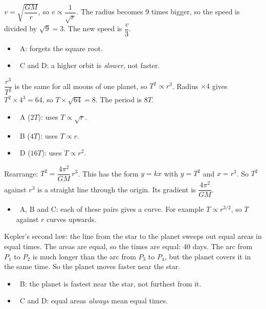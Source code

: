 \documentclass[12pt]{article}
\begin{document}
\begin{practiceanswers}
\begin{practiceans}
  $v = \sqrt{\dfrac{GM}{r}}$, so $v \propto \dfrac{1}{\sqrt{r}}$. The radius becomes 9 times
  bigger, so the speed is divided by $\sqrt{9} = 3$. The new speed is $\dfrac{v}{3}$.
  \begin{itemize}
    \item \xmark\ A: forgets the square root.
    \item \xmark\ C and D: a higher orbit is \emph{slower}, not faster.
  \end{itemize}
\end{practiceans}

\begin{practiceans}
  $\dfrac{r^3}{T^2}$ is the same for all moons of one planet, so $T^2 \propto r^3$. Radius
  $\times 4$ gives $T^2 \times 4^3 = 64$, so $T \times \sqrt{64} = 8$. The period is $8T$.
  \begin{itemize}
    \item \xmark\ A ($2T$): uses $T \propto \sqrt{r}$.
    \item \xmark\ B ($4T$): uses $T \propto r$.
    \item \xmark\ D ($16T$): uses $T \propto r^2$.
  \end{itemize}
\end{practiceans}

\begin{practiceans}
  Rearrange: $T^2 = \dfrac{4\pi^2}{GM}\, r^3$. This has the form $y = kx$ with $y = T^2$ and
  $x = r^3$. So $T^2$ against $r^3$ is a straight line through the origin. Its gradient is
  $\dfrac{4\pi^2}{GM}$.
  \begin{itemize}
    \item \xmark\ A, B and C: each of these pairs gives a curve. For example $T \propto r^{3/2}$, so $T$
          against $r$ curves upwards.
  \end{itemize}
\end{practiceans}

\begin{practiceans}
  Kepler's second law: the line from the star to the planet sweeps out equal areas in equal times.
  The areas are equal, so the times are equal: 40 days. The arc from $P_1$ to $P_2$ is much longer
  than the arc from $P_3$ to $P_4$, but the planet covers it in the same time. So the planet moves
  faster near the star.
  \begin{itemize}
    \item \xmark\ B: the planet is fastest near the star, not furthest from it.
    \item \xmark\ C and D: equal areas \emph{always} mean equal times.
  \end{itemize}
\end{practiceans}


\end{practiceanswers}
\end{document}
